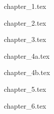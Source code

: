 \documentclass[10pt]{extarticle}
\begin{document}
  \begin{multicols}{2}

    {chapter_1.tex}
    \newpage

    {chapter_2.tex}
    \newpage

    {chapter_3.tex}
    \newpage

    {chapter_4a.tex}
    \newpage

    {chapter_4b.tex}
    \newpage

    {chapter_5.tex}
    \newpage

    {chapter_6.tex}
    \newpage

    \newpage

    \newpage


  \end{multicols}
\end{document}
